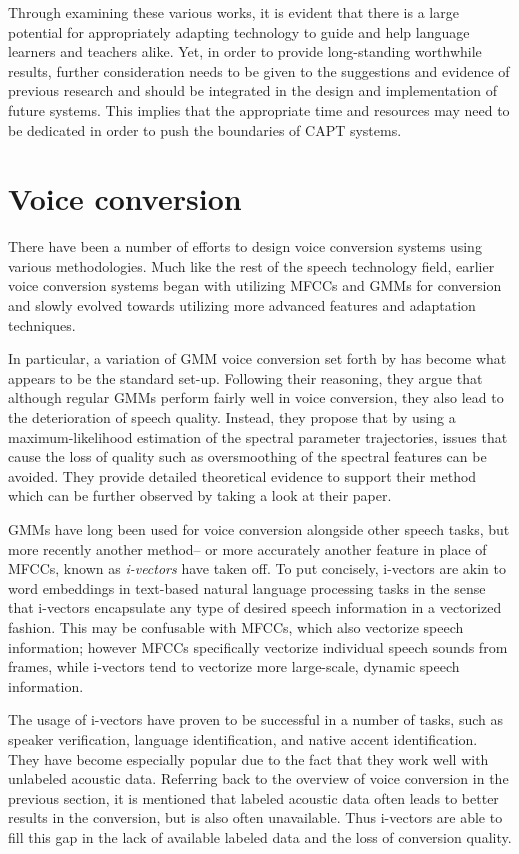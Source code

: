 \documentclass
[
    a4paper,
    twoside,
    12pt,
]
{report}
\begin{document}
Through examining these various works, it is evident that there is a
large potential for appropriately adapting technology to guide and help
language learners and teachers alike. Yet, in order to provide
long-standing worthwhile results, further consideration needs to be
given to the suggestions and evidence of previous research and should be
integrated in the design and implementation of future systems. This
implies that the appropriate time and resources may need to be dedicated
in order to push the boundaries of CAPT systems.

\hypertarget{voice-conversion}{%
\section{Voice conversion}\label{voice-conversion}}

There have been a number of efforts to design voice conversion systems
using various methodologies. Much like the rest of the speech technology
field, earlier voice conversion systems began with utilizing MFCCs and
GMMs for conversion and slowly evolved towards utilizing more advanced
features and adaptation techniques.

In particular, a variation of GMM voice conversion set forth by
\textcite{toda2007} has become what appears to be the standard set-up.
Following their reasoning, they argue that although regular GMMs perform
fairly well in voice conversion, they also lead to the deterioration of
speech quality. Instead, they propose that by using a maximum-likelihood
estimation of the spectral parameter trajectories, issues that cause the
loss of quality such as oversmoothing of the spectral features can be
avoided. They provide detailed theoretical evidence to support their
method which can be further observed by taking a look at their paper.

GMMs have long been used for voice conversion alongside other speech
tasks, but more recently another method-- or more accurately another
feature in place of MFCCs, known as \emph{i-vectors} have taken off. To
put concisely, i-vectors are akin to word embeddings in text-based
natural language processing tasks in the sense that i-vectors
encapsulate any type of desired speech information in a vectorized
fashion. This may be confusable with MFCCs, which also vectorize speech
information; however MFCCs specifically vectorize individual speech
sounds from frames, while i-vectors tend to vectorize more large-scale,
dynamic speech information.

The usage of i-vectors have proven to be successful in a number of
tasks, such as speaker verification, language identification, and native
accent identification. They have become especially popular due to the
fact that they work well with unlabeled acoustic data. Referring back to
the overview of voice conversion in the previous section, it is
mentioned that labeled acoustic data often leads to better results in
the conversion, but is also often unavailable. Thus i-vectors are able
to fill this gap in the lack of available labeled data and the loss of
conversion quality.
\end{document}
